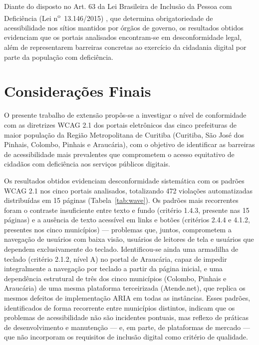 \documentclass[brazil]{ifpr-pinhais}
\begin{document}
Diante do disposto no Art. 63 da Lei Brasileira de Inclusão da Pessoa com Deficiência (Lei n\textsuperscript{o}~13.146/2015) \cite{brasil2015lbi}, que determina obrigatoriedade de acessibilidade nos sítios mantidos por órgãos de governo, os resultados obtidos evidenciam que os portais analisados encontram-se em desconformidade legal, além de representarem barreiras concretas ao exercício da cidadania digital por parte da população com deficiência.

\chapter{Considerações Finais}

O presente trabalho de extensão propôs-se a investigar o nível de conformidade com as diretrizes WCAG 2.1 dos portais eletrônicos das cinco prefeituras de maior população da Região Metropolitana de Curitiba (Curitiba, São José dos Pinhais, Colombo, Pinhais e Araucária), com o objetivo de identificar as barreiras de acessibilidade mais prevalentes que comprometem o acesso equitativo de cidadãos com deficiência aos serviços públicos digitais.

Os resultados obtidos evidenciam desconformidade sistemática com os padrões WCAG 2.1 nos cinco portais analisados, totalizando 472 violações automatizadas distribuídas em 15 páginas (Tabela~\ref{tab:wave}). Os padrões mais recorrentes foram o contraste insuficiente entre texto e fundo (critério 1.4.3, presente nas 15 páginas) e a ausência de texto acessível em links e botões (critérios 2.4.4 e 4.1.2, presentes nos cinco municípios) --- problemas que, juntos, comprometem a navegação de usuários com baixa visão, usuários de leitores de tela e usuários que dependem exclusivamente do teclado. Identificou-se ainda uma armadilha de teclado (critério 2.1.2, nível A) no portal de Araucária, capaz de impedir integralmente a navegação por teclado a partir da página inicial, e uma dependência estrutural de três dos cinco municípios (Colombo, Pinhais e Araucária) de uma mesma plataforma terceirizada (Atende.net), que replica os mesmos defeitos de implementação ARIA em todas as instâncias. Esses padrões, identificados de forma recorrente entre municípios distintos, indicam que os problemas de acessibilidade não são incidentes pontuais, mas reflexo de práticas de desenvolvimento e manutenção --- e, em parte, de plataformas de mercado --- que não incorporam os requisitos de inclusão digital como critério de qualidade.
\end{document}
